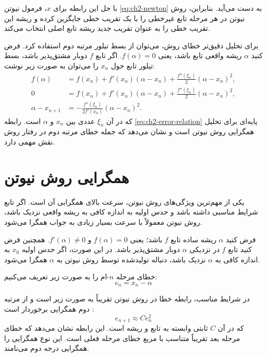 با حل این رابطه برای $x$، فرمول نیوتن \eqref{eq:ch2-newton} به دست می‌آید. بنابراین، روش نیوتن در هر مرحله تابع غیرخطی را با یک تقریب خطی جایگزین کرده و ریشه این تقریب خطی را به عنوان تقریب جدید ریشه تابع اصلی انتخاب می‌کند.

برای تحلیل دقیق‌تر خطای روش، می‌توان از بسط تیلور مرتبه دوم استفاده کرد. فرض کنید $\alpha$ ریشه واقعی تابع باشد، یعنی $f(\alpha)=0$. اگر تابع $f$ دوبار مشتق‌پذیر باشد، بسط تیلور تابع حول $x_n$ را می‌توان به صورت زیر نوشت:
\begin{align}
f(\alpha) &=
f(x_n)+f'(x_n)(\alpha-x_n)
+\frac{f''(\xi_n)}{2}(\alpha-x_n)^2,
\label{eq:ch2-taylor2}\\
0 &=
f(x_n)+f'(x_n)(\alpha-x_n)
+\frac{f''(\xi_n)}{2}(\alpha-x_n)^2,
\label{eq:ch2-taylor2-zero}\\
\alpha - x_{n+1}
&=
-\frac{f''(\xi_n)}{2f'(x_n)}(\alpha-x_n)^2.
\label{eq:ch2-error-relation}
\end{align}
که در آن $\xi_n$ عددی بین $x_n$ و $\alpha$ است. رابطه \eqref{eq:ch2-error-relation} پایه‌ای برای تحلیل همگرایی روش نیوتن است و نشان می‌دهد که جمله خطای مرتبه دوم در رفتار روش نقش مهمی دارد.

\section{همگرایی روش نیوتن}
\label{sec:conv}

یکی از مهم‌ترین ویژگی‌های روش نیوتن، سرعت بالای همگرایی آن است. اگر تابع شرایط مناسبی داشته باشد و حدس اولیه به اندازه کافی به ریشه واقعی نزدیک باشد، روش نیوتن معمولاً با سرعت بسیار زیادی به جواب همگرا می‌شود.

فرض کنید $\alpha$ ریشه ساده تابع $f$ باشد؛ یعنی $f(\alpha)=0$ و $f'(\alpha)\neq 0$. همچنین فرض کنید تابع $f$ در نزدیکی $\alpha$ دوبار مشتق‌پذیر باشد. در این صورت، اگر حدس اولیه $x_0$ به اندازه کافی به $\alpha$ نزدیک باشد، دنباله تولیدشده توسط روش نیوتن به $\alpha$ همگرا می‌شود.

خطای مرحله $n$-ام را به صورت زیر تعریف می‌کنیم:
\begin{equation}
e_n=x_n-\alpha
\label{eq:ch2-error-def}
\end{equation}

در شرایط مناسب، رابطه خطا در روش نیوتن تقریباً به صورت زیر است و از مرتبه دوم همگرایی برخوردار است \cite{atkinson1989introduction}:
\begin{equation}
e_{n+1}\approx C e_n^2
\label{eq:ch2-quadratic-error}
\end{equation}
که در آن $C$ ثابتی وابسته به تابع و ریشه است. این رابطه نشان می‌دهد که خطای مرحله بعد تقریباً متناسب با مربع خطای مرحله فعلی است. این نوع همگرایی را همگرایی درجه دوم می‌نامند.

